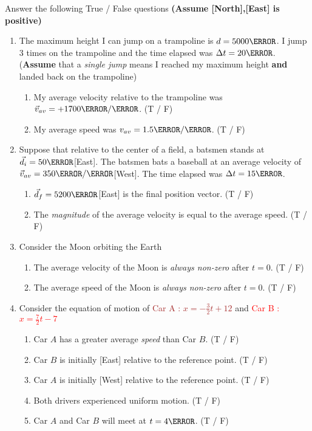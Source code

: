 \documentclass[12pt]{article} %
\begin{document}
\begin{qstn}[1]
	Answer the following True / False questions \textbf{(Assume [North],[East] is positive)}
	\begin{enumerate}
		\item The maximum height I can jump on a trampoline is $d = 5000\m$. I jump $3$ times on the trampoline and the time elapsed was $\Delta t = 20\s$. (\textbf{Assume} that a \emph{single jump} means I reached my maximum height \textbf{and} landed back on the trampoline)
			\begin{enumerate}[label = (\alph*)]
				\item My average velocity relative to the trampoline was $\vec v_{av} = +1700 \m / \s$. (T / F)
				\item My average speed was $v_{av} = 1.5 \km / \s$. (T / F)
			\end{enumerate}


		\item Suppose that relative to the center of a field, a batsmen stands at $\vec d_i = 50\m$[East]. The batsmen bats a baseball at an average velocity of $\vec v_{av} = 350 \m / \s$[West]. The time elapsed was $\Delta t = 15\s$.
			\begin{enumerate}[label = (\alph*)]
				\item $\vec d_f = 5200 \m$[East] is the final position vector. (T / F)
				\item The \emph{magnitude} of the average velocity is equal to the average speed. (T / F)
			\end{enumerate}


		\item Consider the Moon orbiting the Earth
			\begin{enumerate}[label = (\alph*)]
				\item The average velocity of the Moon is \emph{always non-zero} after $t = 0$. (T / F)
				\item The average speed of the Moon is \emph{always non-zero} after $t = 0$. (T / F)
			\end{enumerate}
		
		
		\item Consider the equation of motion of \textcolor{brown}{Car A :} \textcolor{brown}{$x = -\frac{3}{2}t  + 12$} and \textcolor{red}{Car B :} \textcolor{red}{$x = \frac{7}{2}t - 7$}
			\begin{enumerate}[label = (\alph*)]
				\item Car $A$ has a greater average \emph{speed} than Car $B$. (T / F)
				\item Car $B$ is initially [East] relative to the reference point. (T / F)
				\item Car $A$ is initially [West] relative to the reference point. (T / F) 
				\item Both drivers experienced uniform motion. (T / F)
				\item Car $A$ and Car $B$ will meet at $t = 4\s$. (T / F)
			\end{enumerate}
		


\end{enumerate}
\end{qstn}
\end{document}
